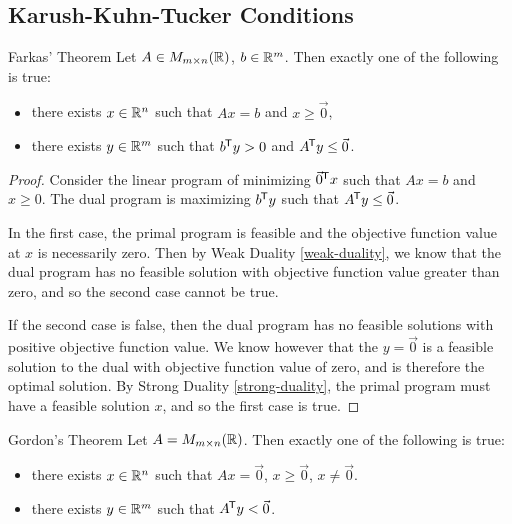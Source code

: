 \subsection{Karush-Kuhn-Tucker Conditions}

\begin{thm}{Farkas' Theorem}\label{farkas}\proofbreak
    Let $A \in M_{m \times n}(\mathbb{R})$, $b \in \mathbb{R}^m$. Then exactly one of the following is true:
    \begin{itemize}
        \item there exists $x \in \mathbb{R}^n$ such that $Ax = b$ and $x \geq \vec{0}$,
        \item there exists $y \in \mathbb{R}^m$ such that $b^{\mkern-1.5mu\mathsf{T}}y > 0$ and $A^{\mkern-1.5mu\mathsf{T}}y \leq \vec{0}$.
    \end{itemize}
\end{thm}

\begin{proof}
    Consider the linear program of minimizing $\vec{0}^{\mkern-1.5mu\mathsf{T}}x$ such that $Ax = b$ and $x \geq {0}$. The dual program is maximizing $b^{\mkern-1.5mu\mathsf{T}}y$ such that $A^{\mkern-1.5mu\mathsf{T}}y \leq \vec{0}$.

    In the first case, the primal program is feasible and the objective function value at $x$ is necessarily zero. Then by Weak Duality \ref{weak-duality}, we know that the dual program has no feasible solution with objective function value greater than zero, and so the second case cannot be true.

    If the second case is false, then the dual program has no feasible solutions with positive objective function value. We know however that the $y = \vec{0}$ is a feasible solution to the dual with objective function value of zero, and is therefore the optimal solution. By Strong Duality \ref{strong-duality}, the primal program must have a feasible solution $x$, and so the first case is true.
\end{proof}

\begin{thm}{Gordon's Theorem}\label{gordons}\proofbreak
    Let $A = M_{m \times n}(\mathbb{R})$. Then exactly one of the following is true:
    \begin{itemize}
        \item there exists $x \in \mathbb{R}^n$ such that $Ax = \vec{0}$, $x \geq \vec{0}$, $x \neq \vec{0}$.
        \item there exists $y \in \mathbb{R}^m$ such that $A^{\mkern-1.5mu\mathsf{T}}y < \vec{0}$.
    \end{itemize}
\end{thm}

